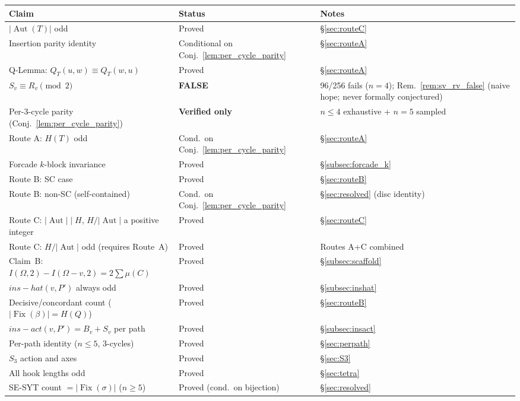 \documentclass[12pt,reqno]{amsart}
\theoremstyle{plain}
\theoremstyle{definition}
\theoremstyle{remark}
\DeclareMathOperator{\Aut}{Aut}
\DeclareMathOperator{\Fix}{Fix}
\newcommand{\routeA}{\textcolor{axisteal}{\textbf{Route~A}}}
\newcommand{\routeB}{\textcolor{axisred}{\textbf{Route~B}}}
\newcommand{\routeC}{\textcolor{inkblue}{\textbf{Route~C}}}
\newcommand{\inshat}{\widehat{\mathrm{ins}}}
\newcommand{\insact}{\mathrm{ins}_{\mathrm{act}}}
\renewcommand{\routeA}{Route A}%
\renewcommand{\routeB}{Route B}%
\renewcommand{\routeC}{Route C}%
\renewcommand{\inshat}{ins-hat}%
\renewcommand{\insact}{ins-act}%
\begin{document}
\begin{center}
\small\renewcommand{\arraystretch}{1.16}
\begin{tabular}{p{6.8cm} l p{3.2cm}}
\toprule
\textbf{Claim} & \textbf{Status} & \textbf{Notes}\\
\midrule
$|\Aut(T)|$ odd & Proved & \S\ref{sec:routeC}\\
Insertion parity identity & Conditional on Conj.~\ref{lem:per_cycle_parity} & \S\ref{sec:routeA}\\
Q-Lemma: $Q_T(u,w)\equiv Q_T(w,u)$ & Proved & \S\ref{sec:routeA}\\
$S_v \equiv R_v \pmod2$ & \textcolor{axisred}{\textbf{FALSE}} & 96/256 fails ($n=4$); Rem.~\ref{rem:sv_rv_false} (naive hope; never formally conjectured)\\
Per-3-cycle parity (Conj.~\ref{lem:per_cycle_parity}) & \textcolor{orange!70!black}{\textbf{Verified only}} & $n\le4$ exhaustive + $n=5$ sampled\\
\routeA: $H(T)$ odd & Cond.\ on Conj.~\ref{lem:per_cycle_parity} & \S\ref{sec:routeA}\\
Forcade $k$-block invariance & Proved & \S\ref{subsec:forcade_k}\\
\routeB: SC case & Proved & \S\ref{sec:routeB}\\
\routeB: non-SC (self-contained) & Cond.\ on Conj.~\ref{lem:per_cycle_parity} & \S\ref{sec:resolved} (disc identity)\\
\routeC: $|\Aut|\mid H$, $H/|\Aut|$ a positive integer & Proved & \S\ref{sec:routeC}\\
\routeC: $H/|\Aut|$ odd (requires Route~A) & Proved & Routes A+C combined\\
Claim~B: $I(\Omega,2) - I(\Omega{-}v,2) = 2\sum\mu(C)$ & Proved & \S\ref{subsec:scaffold}\\
$\inshat(v,P')$ always odd & Proved & \S\ref{subsec:inshat}\\
Decisive/concordant count ($|\Fix(\beta)| = H(Q)$) & Proved & \S\ref{sec:routeB}\\
$\insact(v,P') = B_v+S_v$ per path & Proved & \S\ref{subsec:insact}\\
Per-path identity ($n\leq5$, 3-cycles) & Proved & \S\ref{sec:perpath}\\
$S_3$ action and axes & Proved & \S\ref{sec:S3}\\
All hook lengths odd & Proved & \S\ref{sec:tetra}\\
SE-SYT count $=|\Fix(\sigma)|$ ($n\geq5$) & Proved (cond.\ on bijection) & \S\ref{sec:resolved}\\

\end{tabular}
\end{center}
\end{document}

